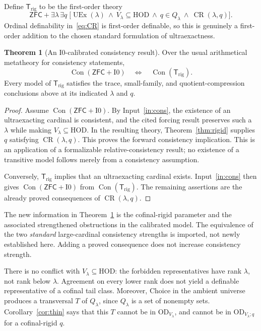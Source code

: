 \documentclass[11pt,letterpaper]{article}
\theoremstyle{definition}
\newtheorem{theorem}[definition]{Theorem}
\numberwithin{equation}{section}
\newcommand{\ZFC}{\mathsf{ZFC}}
\newcommand{\HOD}{\mathrm{HOD}}
\newcommand{\OD}{\mathrm{OD}}
\newcommand{\UEx}{\operatorname{UEx}}
\newcommand{\Con}{\operatorname{Con}}
\newcommand{\Izero}{\mathrm{I0}}
\newcommand{\Q}{Q_\lambda}
\newcommand{\ODlow}{\OD_{V_\lambda}}
\newcommand{\ODq}{\OD_{V_\lambda;q}}
\newcommand{\Rig}{\operatorname{CR}}
\begin{document}
Define $\mathsf{T}_{\mathrm{rig}}$ to be the first-order theory
\begin{equation}
\ZFC+\exists\lambda\,\exists q\;
\bigl[\UEx(\lambda)\ \wedge\ V_\lambda\subseteq\HOD\ \wedge\
q\in\Q\ \wedge\ \Rig(\lambda,q)\bigr].
\label{eq:Tr}
\end{equation}
Ordinal definability in~\eqref{eq:CR} is first-order definable, so this is genuinely a first-order addition to the chosen standard formulation of ultraexactness.

\begin{theorem}[An $\Izero$-calibrated consistency result]\label{thm:cons}
Over the usual arithmetical metatheory for consistency statements,
\begin{equation}
\Con(\ZFC+\Izero)\quad\Longleftrightarrow\quad
\Con(\mathsf{T}_{\mathrm{rig}}).
\label{eq:equicons}
\end{equation}
Every model of $\mathsf{T}_{\mathrm{rig}}$ satisfies the trace, small-family, and quotient-compression conclusions above at its indicated $\lambda$ and $q$.
\end{theorem}
\begin{proof}
Assume $\Con(\ZFC+\Izero)$. By Input~\ref{in:cons}, the existence of an ultraexacting cardinal is consistent, and the cited forcing result preserves such a $\lambda$ while making $V_\lambda\subseteq\HOD$. In the resulting theory, Theorem~\ref{thm:rigid} supplies $q$ satisfying $\Rig(\lambda,q)$. This proves the forward consistency implication. This is an application of a formalizable relative-consistency result; no existence of a transitive model follows merely from a consistency assumption.

Conversely, $\mathsf{T}_{\mathrm{rig}}$ implies that an ultraexacting cardinal exists. Input~\ref{in:cons} then gives $\Con(\ZFC+\Izero)$ from $\Con(\mathsf{T}_{\mathrm{rig}})$. The remaining assertions are the already proved consequences of $\Rig(\lambda,q)$.
\end{proof}

The new information in Theorem~\ref{thm:cons} is the cofinal-rigid parameter and the associated strengthened obstructions in the calibrated model. The equivalence of the two \emph{standard} large-cardinal consistency strengths is imported, not newly established here. Adding a proved consequence does not increase consistency strength.

There is no conflict with $V_\lambda\subseteq\HOD$: the forbidden representatives have rank $\lambda$, not rank below $\lambda$. Agreement on every lower rank does not yield a definable representative of a cofinal tail class. Moreover, Choice in the ambient universe produces a transversal $T$ of $\Q$, since $\Q$ is a set of nonempty sets. Corollary~\ref{cor:thin} says that this $T$ cannot be in $\ODlow$, and cannot be in $\ODq$ for a cofinal-rigid $q$.
\end{document}
